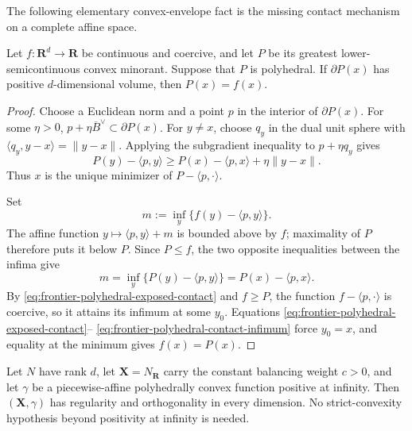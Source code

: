 The following elementary convex-envelope fact is the missing contact
mechanism on a complete affine space.

\begin{lemma}\label{lem:frontier-polyhedral-affine-contact}
Let \(f:\mathbf R^d\to\mathbf R\) be continuous and coercive, and let
\(P\) be its greatest lower-semicontinuous convex minorant.  Suppose that
\(P\) is polyhedral.  If \(\partial P(x)\) has positive
\(d\)-dimensional volume, then \(P(x)=f(x)\).
\end{lemma}

\begin{proof}
Choose a Euclidean norm and a point \(p\) in the interior of
\(\partial P(x)\).  For some \(\eta>0\),
\(p+\eta\overline B^\vee\subset\partial P(x)\).  For \(y\ne x\), choose
\(q_y\) in the dual unit sphere with
\(\langle q_y,y-x\rangle=\lVert y-x\rVert\).  Applying the subgradient
inequality to \(p+\eta q_y\) gives
\begin{equation}
 P(y)-\langle p,y\rangle
 \geq P(x)-\langle p,x\rangle+\eta\lVert y-x\rVert.
 \label{eq:frontier-polyhedral-exposed-contact}
\end{equation}
Thus \(x\) is the unique minimizer of
\(P-\langle p,\cdot\rangle\).

Set
\[
                 m:=\inf_y\{f(y)-\langle p,y\rangle\}.
\]
The affine function \(y\mapsto\langle p,y\rangle+m\) is bounded above by
\(f\); maximality of \(P\) therefore puts it below \(P\).  Since
\(P\leq f\), the two opposite inequalities between the infima give
\begin{equation}
 m=\inf_y\{P(y)-\langle p,y\rangle\}
  =P(x)-\langle p,x\rangle.
 \label{eq:frontier-polyhedral-contact-infimum}
\end{equation}
By \eqref{eq:frontier-polyhedral-exposed-contact} and \(f\geq P\), the
function \(f-\langle p,\cdot\rangle\) is coercive, so it attains its
infimum at some \(y_0\).  Equations
\eqref{eq:frontier-polyhedral-exposed-contact}--
\eqref{eq:frontier-polyhedral-contact-infimum} force \(y_0=x\), and equality
at the minimum gives \(f(x)=P(x)\).
\end{proof}

\begin{theorem}\label{thm:frontier-polyhedral-affine-orthogonality}
Let \(N\) have rank \(d\), let
\(\mathbf X=N_{\mathbf R}\) carry the constant balancing weight
\(c>0\), and let \(\gamma\) be a piecewise-affine polyhedrally convex
function positive at infinity.  Then
\((\mathbf X,\gamma)\) has regularity and orthogonality in every dimension.
No strict-convexity hypothesis beyond positivity at infinity is needed.
\end{theorem}

